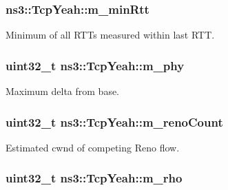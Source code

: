 \subsubsection[{\texorpdfstring{m\+\_\+min\+Rtt}{m_minRtt}}]{ ns3\+::\+Tcp\+Yeah\+::m\+\_\+min\+Rtt\hspace{0.3cm}{\ttfamily [private]}}\hypertarget{classns3_1_1TcpYeah_a03797ee01437476f042a2532916eeb34}{}\label{classns3_1_1TcpYeah_a03797ee01437476f042a2532916eeb34}


Minimum of all R\+T\+Ts measured within last R\+TT. 

\subsubsection[{\texorpdfstring{m\+\_\+phy}{m_phy}}]{\setlength{\rightskip}{0pt plus 5cm}uint32\+\_\+t ns3\+::\+Tcp\+Yeah\+::m\+\_\+phy\hspace{0.3cm}{\ttfamily [private]}}\hypertarget{classns3_1_1TcpYeah_abcb83c9c36e0dbc75a19c4af8e08f8ad}{}\label{classns3_1_1TcpYeah_abcb83c9c36e0dbc75a19c4af8e08f8ad}


Maximum delta from base. 

\subsubsection[{\texorpdfstring{m\+\_\+reno\+Count}{m_renoCount}}]{\setlength{\rightskip}{0pt plus 5cm}uint32\+\_\+t ns3\+::\+Tcp\+Yeah\+::m\+\_\+reno\+Count\hspace{0.3cm}{\ttfamily [private]}}\hypertarget{classns3_1_1TcpYeah_a23724f2976fedf0c221ebad49a54487c}{}\label{classns3_1_1TcpYeah_a23724f2976fedf0c221ebad49a54487c}


Estimated cwnd of competing Reno flow. 

\subsubsection[{\texorpdfstring{m\+\_\+rho}{m_rho}}]{\setlength{\rightskip}{0pt plus 5cm}uint32\+\_\+t ns3\+::\+Tcp\+Yeah\+::m\+\_\+rho\hspace{0.3cm}{\ttfamily [private]}}\hypertarget{classns3_1_1TcpYeah_ada328f61ed71f07744835de4bf78927c}{}\label{classns3_1_1TcpYeah_ada328f61ed71f07744835de4bf78927c}


